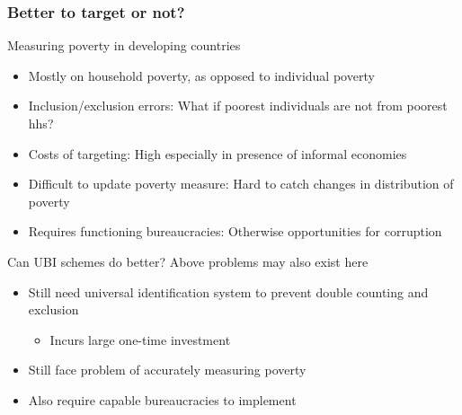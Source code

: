 \documentclass[aspectratio=169]{beamer}
\begin{document}
\begin{frame}
\frametitle{Better to target or not?} 
Measuring poverty in developing countries
\begin{itemize}\setlength\itemsep{3pt}
\item Mostly on household poverty, as opposed to individual poverty
\item Inclusion/exclusion errors: What if poorest individuals are not from poorest hhs?
\item Costs of targeting: High especially in presence of informal economies
\item Difficult to update poverty measure: Hard to catch changes in distribution of poverty
\item Requires functioning bureaucracies: Otherwise opportunities for corruption
\end{itemize}\medskip
Can UBI schemes do better? Above problems may also exist here
\begin{itemize}\setlength\itemsep{3pt}
\item Still need universal identification system to prevent double counting and exclusion
\begin{itemize}\setlength\itemsep{3pt}
\item Incurs large one-time investment
\end{itemize}
\item Still face problem of accurately measuring poverty
\item Also require capable bureaucracies to implement
\end{itemize}
\end{frame}
\end{document}
